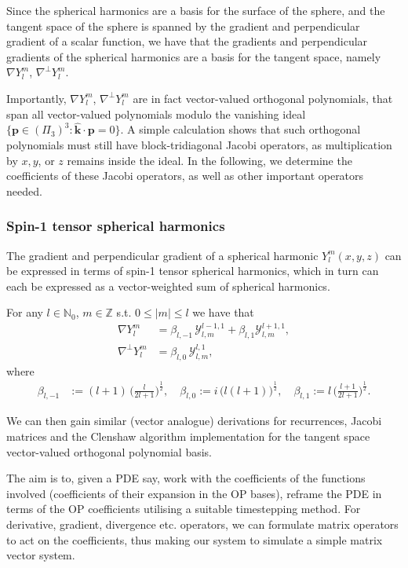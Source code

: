 \documentclass[11pt, oneside]{article}   	%
\newcommand{\half}{\frac{1}{2}}
\newcommand{\Z}{\mathbb{Z}}
\newcommand{\No}{\mathbb{N}_0}
\newcommand{\Ylm}{Y^m_l}
\newcommand{\gradYlm}{\nabla Y^m_l}
\newcommand{\gradpYlm}{\nabla^\perp Y^m_l}
\newcommand{\curlyy}{\bm{\mathcal{Y}}}
\newcommand{\blone}{\beta_{l, 1}}
\newcommand{\blzero}{\beta_{l, 0}}
\newcommand{\blmone}{\beta_{l, -1}}
\newcommand{\unitvec}{\hat{\bm{k}}}
\begin{document}
Since the spherical harmonics are a basis for the surface of the sphere, and the tangent space of the sphere is spanned by the gradient  and perpendicular gradient of a scalar function, we have that the gradients and perpendicular gradients of the spherical harmonics are a basis for the tangent space, namely \(\gradYlm\), \(\gradpYlm\). 

Importantly,  \(\gradYlm\), \(\gradpYlm\) are in fact vector-valued orthogonal polynomials, that span all vector-valued polynomials modulo the vanishing ideal $\{ \bm{p} \in (\Pi_3)^3  : \unitvec \cdot \bm{p} = 0 \}$. A simple calculation shows that such orthogonal polynomials must still have block-tridiagonal Jacobi operators, as multiplication by $x, y$, or $z$ remains inside the ideal. In the following, we determine the coefficients of these Jacobi operators, as well as other important operators needed.

\subsubsection{Spin-1 tensor spherical harmonics}

The gradient and perpendicular gradient of a spherical harmonic \(\Ylm(x,y,z)\) can be expressed in terms of spin-1 tensor spherical harmonics, which in turn can each be expressed as a vector-weighted sum of spherical harmonics.

For any \(l \in \No\), \(m \in \Z\) s.t. \(0 \le |m| \le l\) we have that
\begin{align}
\nabla \Ylm &= \blmone \, \curlyy^{l-1,1}_{l,m} + \blone \curlyy^{l+1,1}_{l,m}, \\
\nabla^\perp \Ylm &= \blzero \, \curlyy^{l,1}_{l,m},
\end{align}
where
\begin{align}
\blmone &:= (l+1) \, \Big(\frac{l}{2l+1}\Big)^\half, \quad
\blzero := i \, \big(l(l+1)\big)^\half, \quad
\blone := l \, \Big(\frac{l+1}{2l+1}\Big)^\half.
\end{align}

We can then gain similar (vector analogue) derivations for recurrences, Jacobi matrices and the Clenshaw algorithm implementation for the tangent space vector-valued orthogonal polynomial basis.

The aim is to, given a PDE say, work with the coefficients of the functions involved (coefficients of their expansion in the OP bases), reframe the PDE in terms of the OP coefficients utilising a suitable timestepping method. For derivative, gradient, divergence etc. operators, we can formulate matrix operators to act on the coefficients, thus making our system to simulate a simple matrix vector system.
\end{document}
